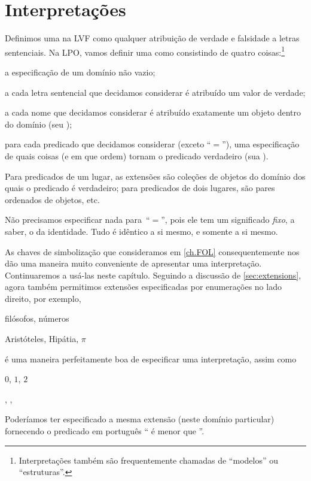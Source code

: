 \section{Interpretações}
Definimos uma  na LVF como qualquer atribuição de verdade e falsidade a letras sentenciais. Na LPO, vamos definir uma  como consistindo de quatro coisas:\footnote{Interpretações também são frequentemente chamadas de \textquotedblleft modelos\textquotedblright{} ou \textquotedblleft estruturas\textquotedblright{}.}



	\begin{compactlist}
\item a especificação de um domínio não vazio;
\item a cada letra sentencial que decidamos considerar é atribuído um valor de verdade;
\item a cada nome que decidamos considerar é atribuído exatamente um objeto dentro do domínio (seu );
\item para cada predicado que decidamos considerar (exceto \textquotedblleft $=$\textquotedblright{}), uma especificação de quais coisas (e em que ordem) tornam o predicado verdadeiro (sua ).



	\end{compactlist}
Para predicados de um lugar, as extensões são coleções de objetos do domínio dos quais o predicado é verdadeiro; para predicados de dois lugares, são pares ordenados de objetos, etc.



Não precisamos especificar nada para~\textquotedblleft $=$\textquotedblright{}, pois ele tem um significado \emph{fixo}, a saber, o da identidade. Tudo é idêntico a si mesmo, e somente a si mesmo.



As chaves de simbolização que consideramos em \cref{ch.FOL} consequentemente nos dão uma maneira muito conveniente de apresentar uma interpretação. Continuaremos a usá-las neste capítulo. Seguindo a discussão de \cref{sec:extensions}, agora também permitimos extensões especificadas por enumerações no lado direito, por exemplo,
\begin{ekey}
\item[\text{domínio}] filósofos, números
	\item[\atom{H}{x}] Aristóteles, Hipátia, $\pi$
\end{ekey}
é uma maneira perfeitamente boa de especificar uma interpretação, assim como
\begin{ekey}
\item[\text{domínio}] $0$, $1$, $2$
	\item[\atom{L}{x,y}] , , 
\end{ekey}
Poderíamos ter especificado a mesma extensão (neste domínio particular) fornecendo o predicado em português \textquotedblleft {} é menor que \textquotedblright{}.


